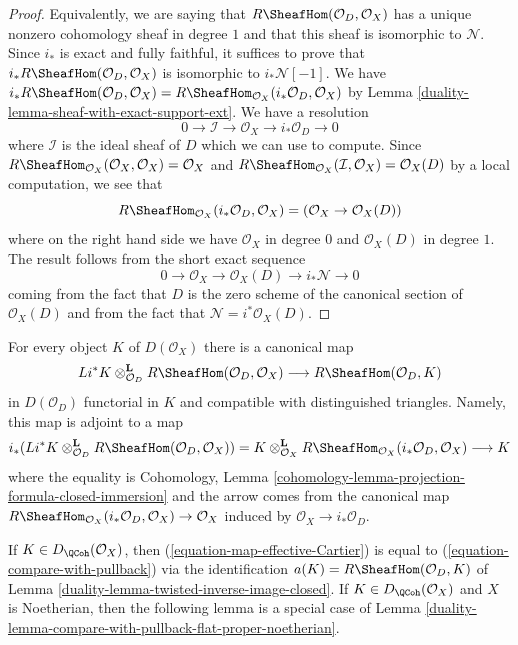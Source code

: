 \begin{proof}

Equivalently, we are saying that $R\SheafHom(\mathcal{O}_D, \mathcal{O}_X)$
has a unique nonzero cohomology sheaf in degree $1$ and that this
sheaf is isomorphic to $\mathcal{N}$. Since $i_*$ is exact and fully
faithful, it suffices to prove that
$i_*R\SheafHom(\mathcal{O}_D, \mathcal{O}_X)$ is isomorphic
to $i_*\mathcal{N}[-1]$. We have
$i_*R\SheafHom(\mathcal{O}_D, \mathcal{O}_X) =
R\SheafHom_{\mathcal{O}_X}(i_*\mathcal{O}_D, \mathcal{O}_X)$
by Lemma \ref{duality-lemma-sheaf-with-exact-support-ext}. We have a resolution
$$
0 \to \mathcal{I} \to \mathcal{O}_X \to i_*\mathcal{O}_D \to 0
$$
where $\mathcal{I}$ is the ideal sheaf of $D$
which we can use to compute. Since
$R\SheafHom_{\mathcal{O}_X}(\mathcal{O}_X, \mathcal{O}_X) = \mathcal{O}_X$ and
$R\SheafHom_{\mathcal{O}_X}(\mathcal{I}, \mathcal{O}_X) = \mathcal{O}_X(D)$ by
a local computation, we see that
$$
R\SheafHom_{\mathcal{O}_X}(i_*\mathcal{O}_D, \mathcal{O}_X) =
(\mathcal{O}_X \to \mathcal{O}_X(D))
$$
where on the right hand side we have $\mathcal{O}_X$ in degree $0$
and $\mathcal{O}_X(D)$ in degree $1$. The result follows from the
short exact sequence
$$
0 \to \mathcal{O}_X \to \mathcal{O}_X(D) \to i_*\mathcal{N} \to 0
$$
coming from the fact that $D$ is the zero scheme of the canonical section
of $\mathcal{O}_X(D)$ and from the fact that
$\mathcal{N} = i^*\mathcal{O}_X(D)$.
\end{proof}

For every object $K$ of $D(\mathcal{O}_X)$ there is a canonical map
\begin{equation}
\label{equation-map-effective-Cartier}
Li^*K
\otimes_{\mathcal{O}_D}^\mathbf{L}
R\SheafHom(\mathcal{O}_D, \mathcal{O}_X)
\longrightarrow
R\SheafHom(\mathcal{O}_D, K)
\end{equation}
in $D(\mathcal{O}_D)$ functorial in $K$ and
compatible with distinguished triangles.
Namely, this map is adjoint to a map
$$
i_*(Li^*K \otimes^\mathbf{L}_{\mathcal{O}_D}
R\SheafHom(\mathcal{O}_D, \mathcal{O}_X)) =
K \otimes^\mathbf{L}_{\mathcal{O}_X}
R\SheafHom_{\mathcal{O}_X}(i_*\mathcal{O}_D, \mathcal{O}_X)
\longrightarrow K
$$
where the equality is
Cohomology, Lemma \ref{cohomology-lemma-projection-formula-closed-immersion}
and the arrow comes from the canonical map
$R\SheafHom_{\mathcal{O}_X}(i_*\mathcal{O}_D, \mathcal{O}_X) \to \mathcal{O}_X$
induced by $\mathcal{O}_X \to i_*\mathcal{O}_D$.

\medskip\noindent
If $K \in D_\QCoh(\mathcal{O}_X)$, then
(\ref{equation-map-effective-Cartier}) is equal to
(\ref{equation-compare-with-pullback}) via the identification
$a(K) = R\SheafHom(\mathcal{O}_D, K)$ of
Lemma \ref{duality-lemma-twisted-inverse-image-closed}.
If $K \in D_\QCoh(\mathcal{O}_X)$ and $X$ is Noetherian, then
the following lemma is a special case of
Lemma \ref{duality-lemma-compare-with-pullback-flat-proper-noetherian}.

